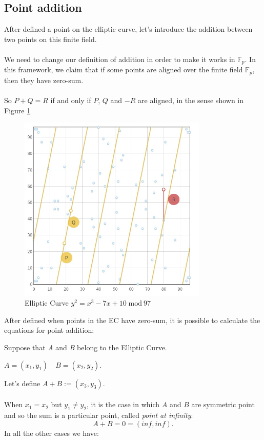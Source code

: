 \subsection{Point addition}
After defined a point on the elliptic curve, let's introduce the addition between two points on this finite field.
\\ \\
We need to change our definition of addition in order to make it works in $\mathbb{F}_p$. In this framework, we claim that if some points are aligned over the finite field $\mathbb{F}_p$, then they have zero-sum.
\\ \\
So $P+Q=R$ if and only if $P$, $Q$ and $-R$ are aligned, in the sense shown in Figure \ref{fig:EC_aligned}
\begin{figure}[ht!]
	\centering
	\includegraphics[width=9cm]{Figures/EC_aligned.jpg}
	\caption{Elliptic Curve $y^2=x^3-7x+10 \; \textrm{mod} \ 97$}
	\label{fig:EC_aligned}
\end{figure}

\begin{flushleft}
	After defined when points in the EC have zero-sum, it is possible to calculate the equations for point addition:
\end{flushleft}
Suppose that \textit{A} and \textit{B} belong to the Elliptic Curve.

\begin{center}
	$ A=(x_1,y_1) \quad B=(x_2,y_2)$.
\end{center}
Let's define $ A+B :=(x_3,y_3) $.
\\ \\
When $x_1=x_2$ but $y_1 \neq y_2$, it is the case in which $A$ and $B$ are symmetric point and so the sum is a particular point, called \textit{point at infinity}: 
\begin{equation*}
A+B=0=	(inf,inf) .
\end{equation*}
In all the other cases we have:



